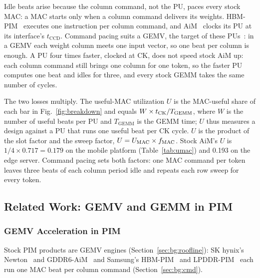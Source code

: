 \begin{table}[t]
  \caption{Useful-MAC utilization on the mobile platform.}
  \label{tab:umac}
  \centering
  \footnotesize
  \setlength{\tabcolsep}{3pt}
  
\end{table}
Idle beats arise because the column command, not the PU, paces every stock MAC: a MAC starts only when a column command
delivers its weights. HBM-PIM~\cite{hbmpim} executes one instruction per column command, and AiM~\cite{aimjssc} clocks
its PU at its interface's $t_\mathrm{CCD}$. Command pacing suits a GEMV, the target of these
PUs~\cite{aimjssc,p3llm}: in a GEMV each weight column meets one input vector, so one beat per column is enough.
A PU four times faster, clocked at CK, does not speed stock AiM up: each column command still brings one column for
one token, so the faster PU computes one beat and idles for three, and every stock GEMM takes the same number of cycles.

The two losses multiply. The useful-MAC utilization $U$ is the MAC-useful share of each bar in
Fig.~\ref{fig:breakdown} and equals $W \times \tck / T_\mathrm{GEMM}$, where $W$ is the number of useful beats per PU
and $T_\mathrm{GEMM}$ is the GEMM time; $U$ thus measures a design against a PU that runs one useful beat per CK cycle. $U$ is the product
of the slot factor and the sweep factor, $U = \UMAC \times \fMAC$.
Stock AiM's $U$ is $1/4 \times 0.717 = 0.179$ on the mobile platform (Table~\ref{tab:umac}) and 0.193 on the edge
server. Command pacing sets both factors: one MAC command per token leaves three beats of each column period idle
and repeats each row sweep for every token.

\subsection{Related Work: GEMV and GEMM in PIM}
\label{sec:bg:walls}

\subsubsection{GEMV Acceleration in PIM}
\label{sec:bg:gemv}

Stock PIM products are GEMV engines (Section~\ref{sec:bg:roofline}): SK hynix's Newton~\cite{newton} and
GDDR6-AiM~\cite{aimjssc} and Samsung's HBM-PIM~\cite{hbmpim} and LPDDR-PIM~\cite{hc35pim} each run one MAC beat per
column command (Section~\ref{sec:bg:cmd}).

